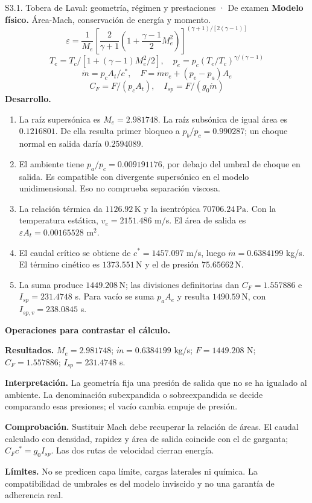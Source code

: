 \begin{studiumworked}{S3.1. Tobera de Laval: geometría, régimen y prestaciones · De examen}
\textbf{Modelo físico.} Área-Mach, conservación de energía y momento.
\[\varepsilon=\frac1{M_e}\left[\frac2{\gamma+1}(1+\frac{\gamma-1}2M_e^2)\right]^{(\gamma+1)/[2(\gamma-1)]}\]
\[T_e=T_c/[1+(\gamma-1)M_e^2/2],\quad p_e=p_c(T_e/T_c)^{\gamma/(\gamma-1)}\]
\[\dot m=p_cA_t/c^*,\quad F=\dot m v_e+(p_e-p_a)A_e\]
\[C_F=F/(p_cA_t),\quad I_{sp}=F/(g_0\dot m)\]
\textbf{Desarrollo.}
\begin{enumerate}
\item La raíz supersónica es $M_e=2.981748$. La raíz subsónica de igual área es $0.1216801$. De ella resulta primer bloqueo a $p_b/p_c=0.990287$; un choque normal en salida daría $0.2594089$.
\item El ambiente tiene $p_a/p_c=0.009191176$, por debajo del umbral de choque en salida. Es compatible con divergente supersónico en el modelo unidimensional. Eso no comprueba separación viscosa.
\item La relación térmica da $1126.92\,\mathrm{K}$ y la isentrópica $70706.24\,\mathrm{Pa}$. Con la temperatura estática, $v_e=2151.486$ m/s. El área de salida es $\varepsilon A_t=0.00165528$ m$^2$.
\item El caudal crítico se obtiene de $c^*=1457.097$ m/s, luego $\dot m=0.6384199$ kg/s. El término cinético es $1373.551\,\mathrm{N}$ y el de presión $75.65662\,\mathrm{N}$.
\item La suma produce $1449.208\,\mathrm{N}$; las divisiones definitorias dan $C_F=1.557886$ e $I_{sp}=231.4748$ s. Para vacío se suma $p_aA_e$ y resulta $1490.59\,\mathrm{N}$, con $I_{sp,v}=238.0845$ s.
\end{enumerate}
\textbf{Operaciones para contrastar el cálculo.}

\textbf{Resultados.} $M_e=2.981748$; $\dot m=0.6384199$ kg/s; $F=1449.208$ N; $C_F=1.557886$; $I_{sp}=231.4748$ s.

\textbf{Interpretación.} La geometría fija una presión de salida que no se ha igualado al ambiente. La denominación subexpandida o sobreexpandida se decide comparando esas presiones; el vacío cambia empuje de presión.

\textbf{Comprobación.} Sustituir Mach debe recuperar la relación de áreas. El caudal calculado con densidad, rapidez y área de salida coincide con el de garganta; $C_Fc^*=g_0I_{sp}$. Las dos rutas de velocidad cierran energía.

\textbf{Límites.} No se predicen capa límite, cargas laterales ni química. La compatibilidad de umbrales es del modelo inviscido y no una garantía de adherencia real.
\end{studiumworked}
